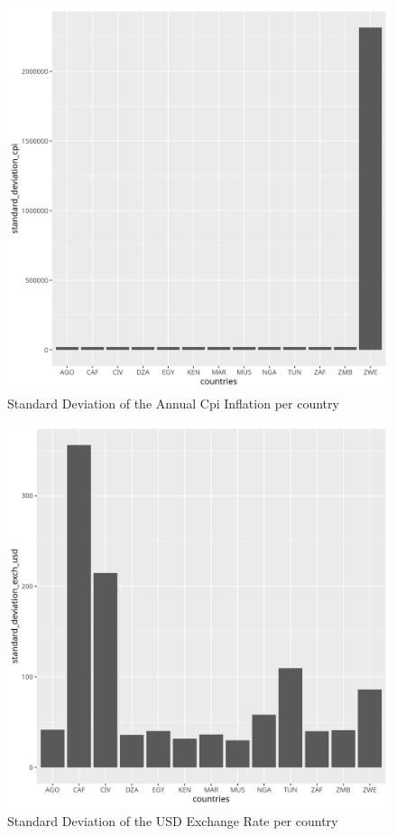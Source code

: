 \documentclass{article}
\begin{document}
    \begin{figure}[h!]
        \caption{Standard Deviation of the Annual Cpi Inflation per country}
        \includegraphics[scale=0.7]{plot4_cpi.png}
    \end{figure}
    \newpage
    \begin{figure}[h!]
        \caption{ Standard Deviation of the USD Exchange Rate per country}
        \includegraphics[scale=0.7]{plot4_exch_usd.png}
    \end{figure}
    
\end{document}
